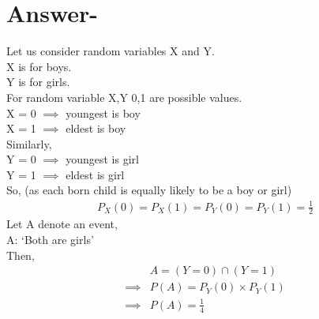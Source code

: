 \documentclass[journal,12pt,twocolumn]{IEEEtran}
\begin{document}
\section{Answer-}
    Let us consider random variables X and Y.  \\
    X is for boys.\\
    Y is for girls. \\
    For random variable X,Y 0,1 are possible values. \\
    X = 0 $\implies$ youngest is boy \\
    X = 1 $\implies$ eldest is boy \\
    Similarly, \\
    Y = 0 $\implies$ youngest is girl \\
    Y = 1 $\implies$ eldest is girl \\
    So, (as each born child is equally likely to be a boy or girl) \\
    \begin{align}
        P_X(0) = P_X(1) = P_Y(0) = P_Y(1) = \frac{1}{2} 
    \end{align}
    Let A denote an event,\\
    A: `Both are girls' \\
    Then, \\
    \begin{align}
        &A = (Y=0) \cap (Y=1) \\
        \implies &P(A) = P_Y(0)\times P_Y(1) \\
        \implies &P(A) = \frac{1}{4}
    \end{align}
\end{document}
